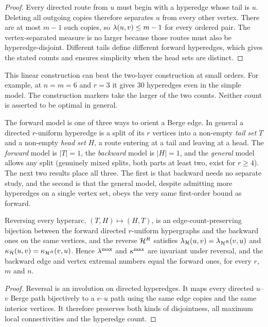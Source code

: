 \begin{proof}
Every directed route from $u$ must begin with a hyperedge whose tail is $u$.
Deleting all outgoing copies therefore separates $u$ from every other
vertex. There are at most $m-1$ such copies, so
$\lambda(u,v)\le m-1$ for every ordered pair. The vertex-separated measure is
no larger because those routes must also be hyperedge-disjoint.
Different tails define different forward hyperedges, which gives the
stated counts and ensures simplicity when the head sets are distinct.
\end{proof}

This linear construction can beat the two-layer construction at small
orders. For example, at $n=m=6$ and $r=3$ it gives $30$ hyperedges even in
the simple model. The construction markers take the larger of the two
counts. Neither count is asserted to be optimal in general.

The forward model is one of three ways to orient a Berge edge. In general a
directed $r$-uniform hyperedge is a split of its $r$ vertices into a non-empty
\emph{tail set} $T$ and a non-empty \emph{head set} $H$, a route entering at a
tail and leaving at a head. The \emph{forward} model is $|T| = 1$, the
\emph{backward} model is $|H| = 1$, and the \emph{general} model allows any split
(genuinely mixed splits, both parts at least two, exist for $r \ge 4$). The next
two results place all three. The first is that backward needs no separate study,
and the second is that the general model, despite admitting more hyperedges on a
single vertex set, obeys the very same first-order bound as forward.

\begin{lemma}\label{lem:dir-hyper-duality}
Reversing every hyperarc, $(T, H) \mapsto (H, T)$, is an edge-count-preserving
bijection between the forward directed $r$-uniform hypergraphs and the backward
ones on the same vertices, and the reverse $\mathcal{H}^{R}$ satisfies
$\lambda_{\mathcal{H}}(u, v) = \lambda_{\mathcal{H}^{R}}(v, u)$ and $\kappa_{\mathcal{H}}(u, v) =
\kappa_{\mathcal{H}^{R}}(v, u)$. Hence $\lambda^{\max}$ and $\kappa^{\max}$ are invariant under
reversal, and the backward edge and vertex extremal numbers equal the forward
ones, for every $r$, $m$ and $n$.
\end{lemma}

\begin{proof}
Reversal is an involution on directed hyperedges. It maps every directed
$u$--$v$ Berge path bijectively to a $v$--$u$ path using the same edge copies
and the same interior vertices. It therefore preserves both kinds of
disjointness, all maximum local connectivities and the hyperedge count.
\end{proof}

